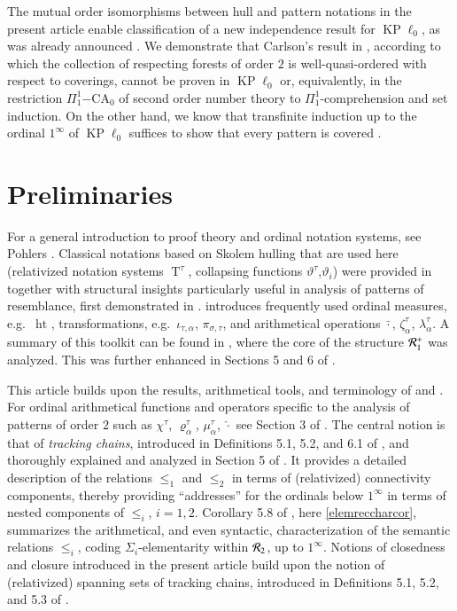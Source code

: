 \documentclass[3p,10pt,times]{elsarticle}
\newcommand{\al}{\alpha}
\newcommand{\la}{\lambda}
\newcommand{\si}{\sigma}
\newcommand{\tht}{\vartheta}
\newcommand{\ze}{\zeta}
\newcommand{\leo}{\le_1}
\newcommand{\thti}{\tht_i}
\newcommand{\thtt}{\tht^\tau}
\newcommand{\Tt}{{\operatorname{T}^\tau}}
\newcommand{\htarg}[1]{\operatorname{ht}_{#1}}
\newcommand{\iotal}{\iota_{\tau,\al}}
\newcommand{\zetal}{{\ze^\tau_\al}}
\newcommand{\latal}{{\la^\tau_\al}}
\newcommand{\pist}{\pi_{\si,\tau}}
\newcommand{\kplnod}{{\operatorname{KP}\!\ell_0}}
\newcommand{\Rtwo}{{{\cal R}_2}}
\newcommand{\Ronepl}{{{\cal R}_1^+}}
\newcommand{\bardot}{\bar{\cdot}}
\newcommand{\oneinf}{1^\infty}
\newcommand{\chit}{\chi^\tau}
\newcommand{\mutal}{\mu^\tau_\al}
\newcommand{\tc}{{\mathrm{tc}}}
\newcommand{\TC}{{\mathrm{TC}}}
\newcommand{\letwo}{\le_2}
\newcommand{\rhoargs}[2]{\varrho^{#1}_{#2}}
\begin{document}
The mutual order isomorphisms between hull and pattern notations in the present article enable classification of a new independence
result for $\kplnod$, as was already announced \cite{W}. 
We demonstrate that Carlson's result in \cite{C16}, according to which the collection of respecting forests of order $2$ is well-quasi-ordered with 
respect to coverings, cannot be proven in $\kplnod$ or, equivalently, in the restriction $\Pi^1_1\mathrm{-CA}_0$ of second order number theory to 
$\Pi^1_1$-comprehension and set induction. On the other hand,
we know that transfinite induction up to the ordinal $1^\infty$ of $\kplnod$ suffices to show that every pattern is covered \cite{CWc}.

\section{Preliminaries}\label{prelimsec}
For a general introduction to proof theory and ordinal notation systems, see Pohlers \cite{P09}. Classical notations 
based on Skolem hulling \cite{P09} that are used here (relativized notation systems $\Tt$\index{$\Tt$}, 
collapsing functions $\thtt$,$\thti$\index{$\thtt$,$\thti$})  
were provided in \cite{W07a} together with structural insights particularly useful
in analysis of patterns of resemblance, first demonstrated in \cite{W07b}.
\cite{W07a} introduces frequently used ordinal measures, e.g.\ $\htarg{}$\index{$\htarg{}$}, 
transformations, e.g.\ $\iotal$\index{$\iotal$}, $\pist$\index{$\pist$}, 
and arithmetical operations $\bardot$\index{$\bardot$}, $\zetal$\index{$\zetal$}, $\latal$\index{$\latal$}.
A summary of this toolkit can be found in \cite{W07c}, where the core of the structure
$\Ronepl$\index{$\r$@$\Ronepl$} was analyzed. This was further enhanced in Sections 5 and 6 of \cite{CWa}. 

This article builds upon the results, arithmetical tools, and terminology of \cite{CWc} and \cite{W}.
For ordinal arithmetical functions and operators specific to the analysis of patterns of order $2$ such as $\chit$\index{$\chit$}, 
$\rhoargs{\tau}{\al}$\index{$\rhoargs{\tau}{\al}$}, $\mutal$\index{$\mutal$}, $\widehat{\cdot}$\index{$\widehat{\cdot}$}
see Section 3 of \cite{CWc}.
The central notion is that of \emph{tracking chains},\index{tracking chains, $\tc$, $\TC$} introduced in Definitions 5.1, 5.2, and 6.1 of \cite{CWc}, 
and thoroughly explained and analyzed in Section 5 of \cite{W}. It provides a detailed description of the relations $\leo$ and $\letwo$ 
in terms of (relativized) connectivity components, thereby providing ``addresses'' for the ordinals below $\oneinf$ in terms of 
nested components of $\le_i$, $i=1,2$.
Corollary 5.8 of \cite{W}, here \ref{elemreccharcor}, summarizes the arithmetical, and even syntactic, 
characterization of the semantic relations $\le_i$, coding $\Sigma_i$-elementarity within $\Rtwo$, up to $\oneinf$.
Notions of closedness and closure introduced in the present article build upon the notion of (relativized) spanning sets of 
tracking chains, introduced in Definitions 5.1, 5.2, and 5.3 of \cite{W}.
\end{document}
